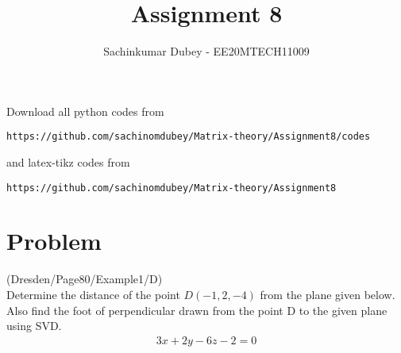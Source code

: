 \documentclass[journal,12pt,twocolumn]{IEEEtran}
\begin{document}
\def\putbox#1#2#3{\makebox[0in][l]{\makebox[#1][l]{}\raisebox{\baselineskip}[0in][0in]{\raisebox{#2}[0in][0in]{#3}}}}
     \def\rightbox#1{\makebox[0in][r]{#1}}
     \def\centbox#1{\makebox[0in]{#1}}
     \def\topbox#1{\raisebox{-\baselineskip}[0in][0in]{#1}}
     \def\midbox#1{\raisebox{-0.5\baselineskip}[0in][0in]{#1}}
\vspace{3cm}
\title{Assignment 8}
\author{Sachinkumar Dubey - EE20MTECH11009}
\maketitle
\newpage
\bigskip
\renewcommand{\thefigure}{\theenumi}
\renewcommand{\thetable}{\theenumi}
Download all python codes from 
\begin{lstlisting}
https://github.com/sachinomdubey/Matrix-theory/Assignment8/codes
\end{lstlisting}
%
and latex-tikz codes from 
%
\begin{lstlisting}
https://github.com/sachinomdubey/Matrix-theory/Assignment8
\end{lstlisting}
\section{Problem}
(Dresden/Page80/Example1/D)\\Determine the distance of the point $D(-1, 2, -4)$ from the plane given below. Also find the foot of perpendicular drawn from the point D to the given plane using SVD.
\begin{align}
3x+2y-6z-2=0\label{eq:1.0.1}
\end{align}
\end{document}
